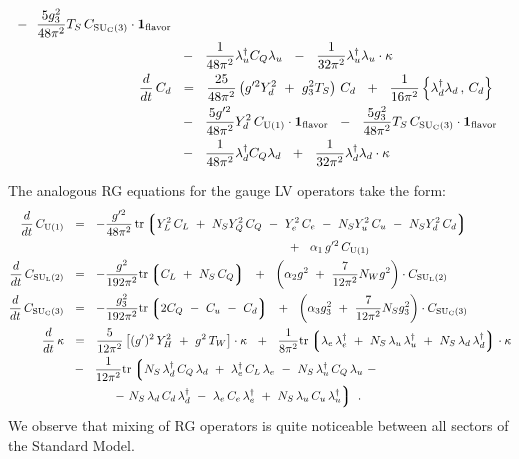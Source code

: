 \documentclass[12pt,preprintnumbers,nofootinbib]{revtex4}
\newcommand{\suc}{{{\rm SU}_{\rm C}(3)}}
\newcommand{\sul}{{{\rm SU}_{\rm L}(2)}}
\newcommand{\ue}{{{\rm U}(1)}}
\newcommand{\uflavor}{\mathbf{1}_{\rm flavor}}
\newcommand{\lgr}{\left\lgroup}
\newcommand{\rgr}{\right\rgroup}
\begin{document}
\begin{align}
	~~-~~
	\frac{5 g_3^2}{48\pi^2} T_S\, C_\suc \cdot \uflavor 
	\\
\notag
	&
	~~-~~
	\frac{1}{48\pi^2}
	\lambda_u^\dag C_Q \lambda_u 
	~~-~~
	\frac{1}{32\pi^2}
	\lambda_u^\dag \lambda_u \cdot
	\kappa
	\\
\notag
	\frac{d}{dt}\, 
	C_d
	&
	~~=~~
	\frac{25}{48\pi^2} 
	\left( g'^2 Y_d^2 ~+~ g_3^2 T_S 
	\right)\, C_d
	~~+~~
	\frac{1}{16\pi^2} 
	\left\{ \lambda_d^\dag \lambda_d \,,\, C_d 
	\right\}
	\\
\notag
	&
	~~-~~
	\frac{5 g'^2}{48\pi^2} Y_d^2 \, C_\ue \cdot \uflavor
	~~-~~
	\frac{5 g_3^2}{48\pi^2} T_S \, C_\suc \cdot \uflavor
	\\
\notag
	&
	~~-~~
	\frac{1}{48\pi^2} \lambda_d^\dag C_Q \lambda_d 
	~~+~~
	\frac{1}{32\pi^2} \lambda_d^\dag \lambda_d \cdot
	\kappa
\end{align}

	The analogous RG equations for the gauge LV operators take the form:
\begin{align}
\label{RG_above_gauge}
\notag
	\frac{d}{dt}\, 
	C_\ue 
	&
	~~=~~
	- \frac{g'^2}{48\pi^2}\,
	{\rm tr} 
	\lgr
		Y_L^2\, C_L ~+~ N_S Y_Q^2\, C_Q ~-~
		Y_e^2\, C_e ~-~ 
		N_S Y_u^2\, C_u ~-~ N_S Y_d^2\, C_d
	\rgr
	\\
\notag
	&
	\qquad\qquad\qquad\qquad\qquad\qquad\qquad\qquad\qquad
	~~+~~
	\alpha_1 \, g'^2 \, C_\ue
	\\
\notag
	\frac{d}{dt}\, 
	C_\sul 
	&
	~~=~~
	- \frac{g^2}{192\pi^2} {\rm tr} \lgr C_L ~+~ N_S \, C_Q \rgr
	~~+~~
	\left(
		\alpha_2 g^2 ~+~
		\frac{7}{12\pi^2}N_W g^2 
	\right) \cdot
	C_\sul
	\\
	\frac{d}{dt}\, 
	C_\suc
	&
	~~=~~
	- \frac{g_3^2}{192\pi^2} 
	{\rm tr} \lgr
		2 C_Q ~-~ C_u ~-~ C_d 
		\rgr
	~~+~~
	\left(
		\alpha_3 g_3^2 ~+~
		\frac{7}{12\pi^2} N_S g_3^2
	\right) \cdot
	C_\suc
	\\
\notag
	\frac{d}{dt}\, 
	\kappa
	&
	~~=~~
	\frac{5}{12\pi^2} 
	\left[
		(g')^2\, Y_H^2 ~+~ g^2\, T_W
	\right] \cdot \kappa
	~~+~~
	\frac{1}{8\pi^2}
	{\rm tr}
	\lgr
		\lambda_e\, \lambda_e^\dag
		~+~
		N_S\, \lambda_u\, \lambda_u^\dag
		~+~
		N_S\, \lambda_d\, \lambda_d^\dag
	\rgr
	\cdot \kappa
	\\
\notag
	&
	~~-~~
	\frac{1}{12\pi^2}
	{\rm tr} 
	\lgr
		N_S\, \lambda_d^\dag\, C_Q\, \lambda_d 
		~+~
		\lambda_e^\dag\, C_L\, \lambda_e
		~-~
		N_S\, \lambda_u^\dag\, C_Q\, \lambda_u
		~-
	\right.
	\\
\notag
	&
	\qquad\qquad
	\left.
		-~
		N_S\, \lambda_d\, C_d\, \lambda_d^\dag
		~-~
		\lambda_e\, C_e\, \lambda_e^\dag
		~+~
		N_S\, \lambda_u\, C_u\, \lambda_u^\dag
	\rgr
	~.
\end{align}
	We observe that mixing of RG operators is quite noticeable between all sectors
	of the Standard Model.
\end{document}

